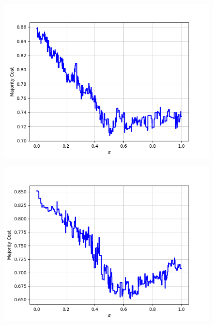 \begin{figure}[H]
\begin{minipage}{.24\textwidth}
  {\includegraphics[width=\linewidth]{plots/omniglot-intra-ac/Braille}}
\end{minipage}
\begin{minipage}{.24\textwidth}
  \centering
  {\includegraphics[width=\linewidth]{plots/omniglot-intra-ac/Burmese_(Myanmar)}}
\end{minipage}
\begin{minipage}{.24\textwidth}
  \centering

\end{minipage}
\end{figure}
